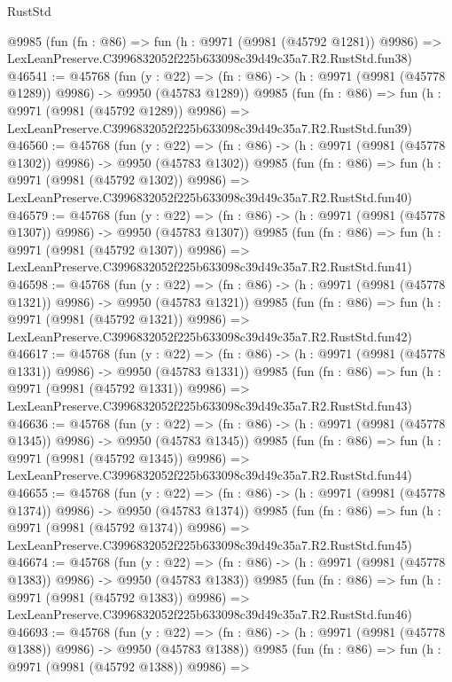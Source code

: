 \begin{lexlean}{RustStd}
\begin{coremodule}
    @9985
    (fun (fn : @86) =>
    fun (h : @9971 (@9981 (@45792 @1281)) @9986) =>
    LexLeanPreserve.C3996832052f225b633098c39d49c35a7.R2.RustStd.fun38)
@46541 := @45768
    (fun (y : @22) =>
    (fn : @86) -> (h : @9971 (@9981 (@45778 @1289)) @9986) -> @9950 (@45783 @1289))
    @9985
    (fun (fn : @86) =>
    fun (h : @9971 (@9981 (@45792 @1289)) @9986) =>
    LexLeanPreserve.C3996832052f225b633098c39d49c35a7.R2.RustStd.fun39)
@46560 := @45768
    (fun (y : @22) =>
    (fn : @86) -> (h : @9971 (@9981 (@45778 @1302)) @9986) -> @9950 (@45783 @1302))
    @9985
    (fun (fn : @86) =>
    fun (h : @9971 (@9981 (@45792 @1302)) @9986) =>
    LexLeanPreserve.C3996832052f225b633098c39d49c35a7.R2.RustStd.fun40)
@46579 := @45768
    (fun (y : @22) =>
    (fn : @86) -> (h : @9971 (@9981 (@45778 @1307)) @9986) -> @9950 (@45783 @1307))
    @9985
    (fun (fn : @86) =>
    fun (h : @9971 (@9981 (@45792 @1307)) @9986) =>
    LexLeanPreserve.C3996832052f225b633098c39d49c35a7.R2.RustStd.fun41)
@46598 := @45768
    (fun (y : @22) =>
    (fn : @86) -> (h : @9971 (@9981 (@45778 @1321)) @9986) -> @9950 (@45783 @1321))
    @9985
    (fun (fn : @86) =>
    fun (h : @9971 (@9981 (@45792 @1321)) @9986) =>
    LexLeanPreserve.C3996832052f225b633098c39d49c35a7.R2.RustStd.fun42)
@46617 := @45768
    (fun (y : @22) =>
    (fn : @86) -> (h : @9971 (@9981 (@45778 @1331)) @9986) -> @9950 (@45783 @1331))
    @9985
    (fun (fn : @86) =>
    fun (h : @9971 (@9981 (@45792 @1331)) @9986) =>
    LexLeanPreserve.C3996832052f225b633098c39d49c35a7.R2.RustStd.fun43)
@46636 := @45768
    (fun (y : @22) =>
    (fn : @86) -> (h : @9971 (@9981 (@45778 @1345)) @9986) -> @9950 (@45783 @1345))
    @9985
    (fun (fn : @86) =>
    fun (h : @9971 (@9981 (@45792 @1345)) @9986) =>
    LexLeanPreserve.C3996832052f225b633098c39d49c35a7.R2.RustStd.fun44)
@46655 := @45768
    (fun (y : @22) =>
    (fn : @86) -> (h : @9971 (@9981 (@45778 @1374)) @9986) -> @9950 (@45783 @1374))
    @9985
    (fun (fn : @86) =>
    fun (h : @9971 (@9981 (@45792 @1374)) @9986) =>
    LexLeanPreserve.C3996832052f225b633098c39d49c35a7.R2.RustStd.fun45)
@46674 := @45768
    (fun (y : @22) =>
    (fn : @86) -> (h : @9971 (@9981 (@45778 @1383)) @9986) -> @9950 (@45783 @1383))
    @9985
    (fun (fn : @86) =>
    fun (h : @9971 (@9981 (@45792 @1383)) @9986) =>
    LexLeanPreserve.C3996832052f225b633098c39d49c35a7.R2.RustStd.fun46)
@46693 := @45768
    (fun (y : @22) =>
    (fn : @86) -> (h : @9971 (@9981 (@45778 @1388)) @9986) -> @9950 (@45783 @1388))
    @9985
    (fun (fn : @86) =>
    fun (h : @9971 (@9981 (@45792 @1388)) @9986) =>

\end{coremodule}
\end{lexlean}

